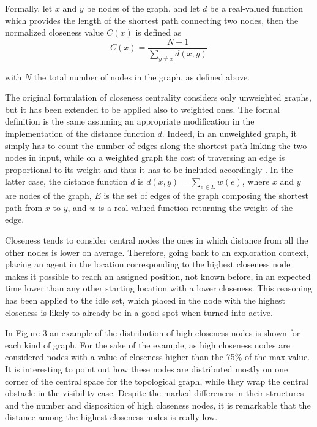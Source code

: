 Formally, let $x$ and $y$ be nodes of the graph, and let $d$ be
a real-valued function which provides the length of the shortest path
connecting two nodes, then the normalized closeness value $C\left(x\right)$
is defined as 
\[
C\left(x\right)=\frac{N-1}{\sum_{y\neq x}d\left(x,y\right)}
\]

with $N$ the total number of nodes in the graph, as defined above. 

The original formulation of closeness centrality considers only unweighted
graphs, but it has been extended to be applied also to weighted ones.
The formal definition is the same assuming an appropriate modification
in the implementation of the distance function $d$. Indeed, in an
unweighted graph, it simply has to count the number of edges along
the shortest path linking the two nodes in input, while on a weighted
graph the cost of traversing an edge is proportional to its weight
and thus it has to be included accordingly \cite{Newman2001}.
In the latter case, the distance function $d$ is $d\left(x,y\right)=\sum_{e\in E}w\left(e\right)$,
where $x$ and $y$ are nodes of the graph, $E$ is the set of edges
of the graph composing the shortest path from $x$ to $y$, and $w$
is a real-valued function returning the weight of the edge. 

Closeness tends to consider central nodes the ones in which distance
from all the other nodes is lower on average. Therefore, going back
to an exploration context, placing an agent in the location corresponding
to the highest closeness node makes it possible to reach an assigned
position, not known before, in an expected time lower than any other
starting location with a lower closeness. This reasoning has been
applied to the idle set, which placed in the node with the highest
closeness is likely to already be in a good spot when turned into
active. 

In Figure 3 an example of the distribution of high closeness nodes
is shown for each kind of graph. For the sake of the example, as high
closeness nodes are considered nodes with a value of closeness higher
than the 75\% of the max value. It is interesting to point out how
these nodes are distributed mostly on one corner of the central space
for the topological graph, while they wrap the central obstacle in
the visibility case. Despite the marked differences in their structures
and the number and disposition of high closeness nodes, it is remarkable
that the distance among the highest closeness nodes is really low. 

